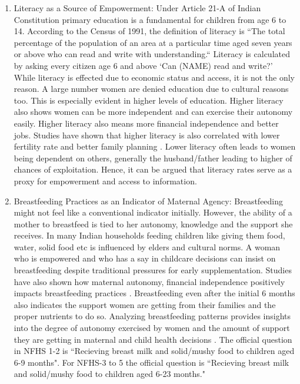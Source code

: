 \begin{enumerate}
\item Literacy as a Source of Empowerment:
 Under Article 21-A of Indian Constitution primary education is a fundamental for children from age 6 to 14. According to the Census of 1991, the definition of literacy is ``The total percentage of the population of an area at a particular time aged seven years or above who can read and write with understanding.`` Literacy is calculated by asking every citizen  age 6 and above `Can (NAME) read and write?' While literacy is effected due to economic status and access, it is not the only reason.  A large number women are denied education due to cultural reasons too. This is especially evident in higher levels of education. Higher literacy also shows women can be more independent and can exercise their autonomy easily. Higher literacy also means more financial independence and better jobs. Studies have shown that higher literacy is also correlated with lower fertility rate and better family planning \citep{kumar2022measuring}. Lower literacy often leads to women being dependent on others, generally the husband/father leading to higher of chances of exploitation. Hence, it can be argued that literacy rates serve as a proxy for  empowerment and access to information. 

\item  Breastfeeding Practices as an Indicator of Maternal Agency: Breastfeeding might not feel like a conventional indicator initially. However, the ability of a mother to breastfeed  is  tied to her autonomy, knowledge and the support she receives. In many Indian households feeding children like giving them food, water, solid food etc is influenced by elders and cultural norms. A woman who is empowered and who has a say in childcare decisions can insist on  breastfeeding despite traditional pressures for early supplementation. Studies have also shown how maternal autonomy, financial independence positively impacts breastfeeding practices \citep{shroff2011does}. Breastfeeding even after the initial 6 months also indicates the support women are getting from their families and the proper nutrients to do so. Analyzing breastfeeding patterns provides insights into the degree of autonomy exercised by women and the amount of support they are getting  in maternal and child health decisions \citep{Delawarde-Saïas2024}. The official question in NFHS 1-2 is ``Recieving breast milk and solid/mushy food to children aged 6-9 months". For NFHS-3 to 5 the official question is ``Recieving breast milk and solid/mushy food to children aged 6-23 months."
\end{enumerate}

